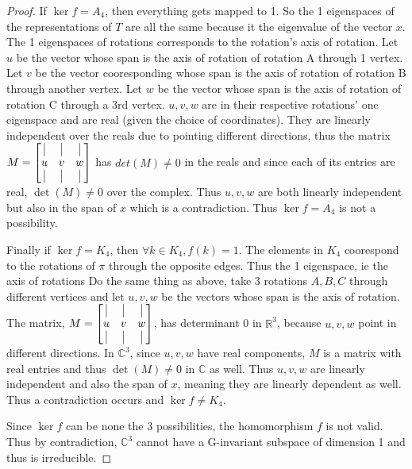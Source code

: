 \documentclass{article}
\newcommand{\C}{\mathbb{C}}
\newcommand{\R}{\mathbb{R}}
\begin{document}
\begin{proof}
    If $\ker f = A_4$, then everything gets mapped to 1. So the 1 eigenspaces of the representations of $T$ are all the same because it the eigenvalue of the vector $x$. The 1 eigenspaces of rotations corresponds to the rotation's axis of rotation. Let $u$ be the vector whose span is the axis of rotation of rotation A through 1 vertex. Let $v$ be the vector cooresponding whose span is the axis of rotation of rotation B through another vertex. Let $w$ be the vector whose span is the axis of rotation of rotation C through a 3rd vertex. $u, v, w$ are in their respective rotations' one eigenspace and are real (given the choice of coordinates). They are linearly independent over the reals due to pointing different directions, thus the matrix $M = \begin{bmatrix}
        \vline & \vline & \vline \\
        u & v & w \\ 
        \vline & \vline & \vline \\
    \end{bmatrix}$ has $det(M) \neq 0$ in the reals and since each of its entries are real, $\det(M) \neq 0$ over the complex. Thus $u,v,w$ are both linearly independent but also in the span of $x$ which is a contradiction. Thus $\ker f = A_4$ is not a possibility. 
    
        
    Finally if $\ker f = K_4$, then $\forall k \in K_4, f(k) = 1$. The elements in $K_4$ coorespond to the rotations of $\pi$ through the opposite edges. Thus the 1 eigenspace, ie the axis of rotations Do the same thing as above, take 3 rotations $A, B, C$  through different vertices and let $u, v, w$ be the vectors whose span is the axis of rotation. The matrix, $M = \begin{bmatrix}
        \vline & \vline & \vline \\
        u & v & w \\ 
        \vline & \vline & \vline \\
    \end{bmatrix}$, has determinant 0 in $\R^3$, because $u, v, w$ point in different directions. In $\C^3$, since $u, v, w$ have real components, $M$ is a matrix with real entries and thus $\det(M) \neq 0$ in $\C$ as well. Thus $u, v, w$ are linearly independent and also the span of $x$, meaning they are linearly dependent as well. Thus a contradiction occurs and $\ker f \neq K_4$.
    
    Since $\ker f$ can be none the 3 possibilities, the homomorphism $f$ is not valid. Thus by contradiction, $\C^3$ cannot have a G-invariant subspace of dimension 1 and thus is irreducible.   
\end{proof}
\end{document}
